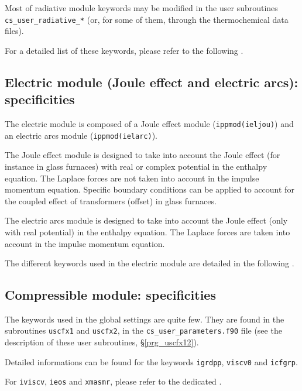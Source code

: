 Most of radiative module keywords may be modified in the user subroutines
\texttt{cs\_user\_radiative\_*} (or, for some of them, through the
thermochemical data files).

For a detailed list of these keywords, please refer to the following
.

\subsection{Electric module (Joule effect and electric arcs): specificities}

The electric module is composed of a Joule effect module
(\texttt{ippmod(ieljou)}) and an electric arcs module
(\texttt{ippmod(ielarc)}).

The Joule effect module is designed to take into account the Joule effect
(for instance in glass furnaces) with real or complex potential in the
enthalpy equation. The Laplace forces are not taken into account in the
impulse momentum equation. Specific boundary conditions can be applied to
account for the coupled effect of transformers (offset) in glass furnaces.

The electric arcs module is designed to take into account the Joule effect
(only with real potential) in the enthalpy equation. The Laplace forces
are taken into account in the impulse momentum equation.

The different keywords used in the electric module are detailed in
the following .

\subsection{Compressible module: specificities}

The keywords used in the global settings are quite few. They are
found in the subroutines \texttt{uscfx1} and \texttt{uscfx2}, in
the \texttt{cs\_user\_parameters.f90} file (see the
description of these user subroutines, \S\ref{prg_uscfx12}).

Detailed informations can be found
 for the keywords
\texttt{igrdpp}, \texttt{viscv0} and \texttt{icfgrp}.

For \texttt{iviscv}, \texttt{ieos} and \texttt{xmasmr},
please refer to the dedicated
.

